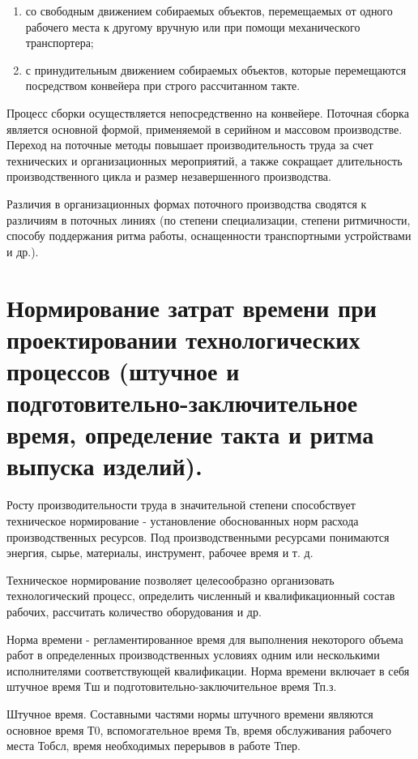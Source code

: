 \documentclass[unicode, 12pt, a4paper, oneside]{article}
\begin{document}
\begin{enumerate}
\item со свободным движением собираемых объектов, перемещаемых от одного рабочего места к другому вручную или при помощи механического транспортера;
\item с принудительным движением собираемых объектов, которые перемещаются посредством конвейера при строго рассчитанном такте.
\end{enumerate}

Процесс сборки осуществляется непосредственно на конвейере. Поточная сборка является основной формой, применяемой в серийном и массовом производстве. Переход на поточные методы повышает производительность труда за счет технических и организационных мероприятий, а также сокращает длительность производственного цикла и размер незавершенного производства.

Различия в организационных формах поточного производства сводятся к различиям в поточных линиях (по степени специализации, степени ритмичности, способу поддержания ритма работы, оснащенности транспортными устройствами и др.).


\section{Нормирование затрат времени при проектировании технологических процессов (штучное и подготовительно-заключительное время, определение такта и ритма выпуска изделий).}

Росту производительности труда в значительной степени способствует техническое нормирование - установление обоснованных норм расхода производственных ресурсов. Под производственными ресурсами понимаются энергия, сырье, материалы, инструмент, рабочее время и т. д.

Техническое нормирование позволяет целесообразно организовать технологический процесс, определить численный и квалификационный состав рабочих, рассчитать количество оборудования и др.

Норма времени - регламентированное время для выполнения некоторого объема работ в определенных производственных условиях одним или несколькими исполнителями соответствующей квалификации. Норма времени включает в себя штучное время Тш и подготовительно-заключительное время Тп.з.

Штучное время. Составными частями нормы штучного времени являются основное время Т0, вспомогательное время Тв, время обслуживания рабочего места Тобсл, время необходимых перерывов в работе Тпер.
\end{document}
